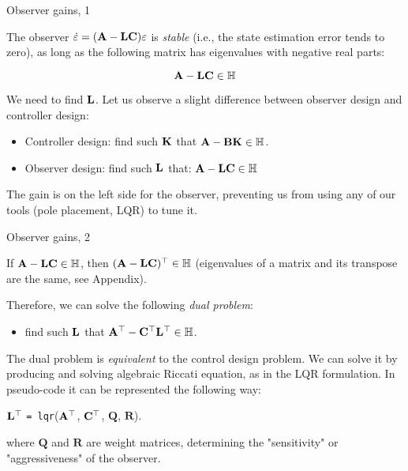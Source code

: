 \documentclass{beamer}
\begin{document}
\begin{frame}{Observer gains, 1}
\begin{flushleft}

The observer $\dot {\varepsilon}= 
(\mathbf{A} - \mathbf{L} \mathbf{C}) \varepsilon$ is \emph{stable} (i.e., the state estimation error tends to zero), as long as the following matrix has eigenvalues with negative real parts:

\begin{equation}
\mathbf{A} - 
\mathbf{L} \mathbf{C} \in \mathbb{H}
\end{equation}

We need to find $\mathbf{L}$. Let us observe a slight difference between observer design and controller design:

\bigskip

\begin{itemize}
    \item Controller design: find such $\mathbf{K}$ that $\mathbf{A} - \mathbf{B} \mathbf{K} \in \mathbb{H}$.
    \item Observer design: find such $\mathbf{L}$ that: $\mathbf{A} - \mathbf{L} \mathbf{C} \in \mathbb{H}$
\end{itemize}

\bigskip

The gain is on the left side for the observer, preventing us from using any of our tools (pole placement, LQR) to tune it.

\end{flushleft}
\end{frame}


\begin{frame}{Observer gains, 2}
\begin{flushleft}

If $\mathbf{A} - \mathbf{L} \mathbf{C}\in \mathbb{H}$, then $(\mathbf{A} - 
\mathbf{L} \mathbf{C})^{\top}\in \mathbb{H}$ (eigenvalues of a matrix and its transpose are the same, see Appendix). 

\bigskip

Therefore, we can solve the following \emph{dual problem}:

\begin{itemize}
    \item find such $\mathbf{L}$ that $\mathbf{A}^{\top} - 
\mathbf{C}^{\top} \mathbf{L}^{\top} \in \mathbb{H}$.
\end{itemize}

\bigskip

The dual problem is \emph{equivalent} to the control design problem. We can solve it by producing and solving algebraic Riccati equation, as in the LQR formulation. In pseudo-code it can be represented the following way:

\bigskip

$\mathbf{L}^{\top}$ \texttt{= lqr}($\mathbf{A}^{\top}$, $\mathbf{C}^{\top}$, $\mathbf Q$, $\mathbf R$).

where $\mathbf Q$ and $\mathbf R$ are weight  matrices, determining the "sensitivity" or "aggressiveness" of the observer.


\end{flushleft}
\end{frame}
\end{document}
